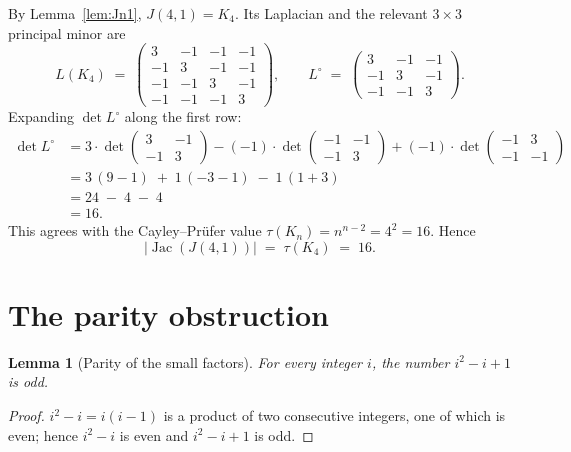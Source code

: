 \documentclass[11pt]{article}
\newtheorem{lemma}{Lemma}
\theoremstyle{definition}
\begin{document}
By Lemma~\ref{lem:Jn1}, $J(4,1) = K_4$. Its Laplacian and the relevant $3\times 3$
principal minor are
\[
L(K_4) \;=\;
\begin{pmatrix}
 3 & -1 & -1 & -1\\
-1 &  3 & -1 & -1\\
-1 & -1 &  3 & -1\\
-1 & -1 & -1 &  3
\end{pmatrix},
\qquad
L^{\circ} \;=\;
\begin{pmatrix}
 3 & -1 & -1\\
-1 &  3 & -1\\
-1 & -1 &  3
\end{pmatrix}.
\]
Expanding $\det L^{\circ}$ along the first row:
\begin{align*}
\det L^{\circ}
 &= 3\cdot\det\begin{pmatrix}3&-1\\-1&3\end{pmatrix}
   -(-1)\cdot\det\begin{pmatrix}-1&-1\\-1&3\end{pmatrix}
   +(-1)\cdot\det\begin{pmatrix}-1&3\\-1&-1\end{pmatrix}\\[2pt]
 &= 3\,(9-1) \;+\; 1\,(-3-1) \;-\; 1\,(1+3)\\
 &= 24 \;-\; 4 \;-\; 4\\
 &= 16.
\end{align*}
This agrees with the Cayley--Pr\"ufer value $\tau(K_n)=n^{n-2}=4^2=16$. Hence
\begin{equation}\label{eq:tauK4}
|\operatorname{Jac}(J(4,1))| \;=\; \tau(K_4) \;=\; 16 .
\end{equation}

\section{The parity obstruction}

\begin{lemma}[Parity of the small factors]\label{lem:odd}
For every integer $i$, the number $i^2 - i + 1$ is odd.
\end{lemma}
\begin{proof}
$i^2 - i = i(i-1)$ is a product of two consecutive integers, one of which is even;
hence $i^2-i$ is even and $i^2-i+1$ is odd.
\end{proof}
\end{document}
